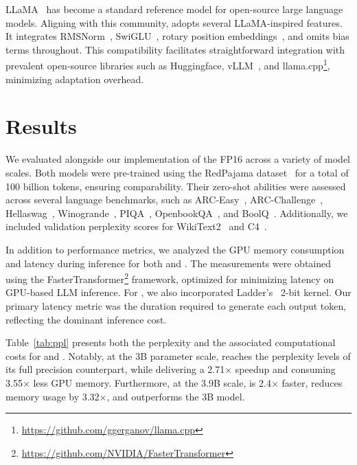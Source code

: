 LLaMA~\cite{llama, llama2} has become a standard reference model for open-source large language models. Aligning with this community,  adopts several LLaMA-inspired features. It integrates RMSNorm~\cite{rmsnorm}, SwiGLU~\cite{swiglu}, rotary position embeddings~\cite{rope}, and omits bias terms throughout. This compatibility facilitates straightforward integration with prevalent open-source libraries such as Huggingface, vLLM~\cite{vllm}, and llama.cpp\footnote{\url{https://github.com/ggerganov/llama.cpp}}, minimizing adaptation overhead.

\section{Results}

We evaluated  alongside our implementation of the FP16  across a variety of model scales. Both models were pre-trained using the RedPajama dataset~\cite{redpajama} for a total of 100 billion tokens, ensuring comparability. Their zero-shot abilities were assessed across several language benchmarks, such as ARC-Easy~\cite{arc}, ARC-Challenge~\cite{arc}, Hellaswag~\cite{hellaswag}, Winogrande~\cite{winoGrande}, PIQA~\cite{piqa}, OpenbookQA~\cite{openbookqa}, and BoolQ~\cite{boolq}. Additionally, we included validation perplexity scores for WikiText2~\cite{wikitext2} and C4~\cite{c4}.

In addition to performance metrics, we analyzed the GPU memory consumption and latency during inference for both  and . The measurements were obtained using the FasterTransformer\footnote{\url{https://github.com/NVIDIA/FasterTransformer}} framework, optimized for minimizing latency on GPU-based LLM inference. For , we also incorporated Ladder’s~\cite{ladder} 2-bit kernel. Our primary latency metric was the duration required to generate each output token, reflecting the dominant inference cost.

Table~\ref{tab:ppl} presents both the perplexity and the associated computational costs for  and . Notably, at the 3B parameter scale,  reaches the perplexity levels of its full precision counterpart, while delivering a 2.71$\times$ speedup and consuming 3.55$\times$ less GPU memory. Furthermore, at the 3.9B scale,  is 2.4$\times$ faster, reduces memory usage by 3.32$\times$, and outperforms the 3B  model.

